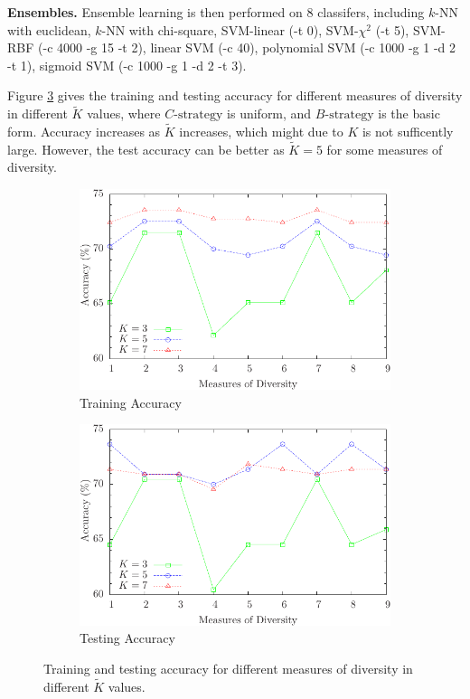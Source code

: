 \textbf{Ensembles.} Ensemble learning is then performed on 8 classifers, including $k$-NN with euclidean, $k$-NN with chi-square, SVM-linear (-t 0), SVM-$\chi^2$ (-t 5), SVM-RBF (-c 4000 -g 15 -t 2), linear SVM (-c 40), polynomial SVM (-c 1000 -g 1 -d 2 -t 1), sigmoid SVM (-c 1000 -g 1 -d 2 -t 3). 

Figure \ref{fig:diversity_k} gives the training and testing accuracy for different measures of diversity in different $\tilde{K}$ values, where $C\text{-strategy}$ is uniform, and $B\text{-strategy}$ is the basic form. Accuracy increases as $\tilde{K}$ increases, which might due to $K$ is not sufficently large. However, the test accuracy can be better as 
$\tilde{K}=5$ for some measures of diversity. 

\begin{figure} [t]
\centering
\begin{subfigure}{.45\textwidth}
  \centering
  \includegraphics[width=.95\linewidth]{../Figure/diversity_k_train}
  \caption{Training Accuracy}
  \label{fig:diversity_k_train}
\end{subfigure}%
\begin{subfigure}{.45\textwidth}
  \centering
  \includegraphics[width=.95\linewidth]{../Figure/diversity_k_test}
  \caption{Testing Accuracy}
  \label{fig:diversity_k_test}
\end{subfigure}
\caption{Training and testing accuracy for different measures of diversity in different $\tilde{K}$ values.}
\label{fig:diversity_k}
\end{figure}

